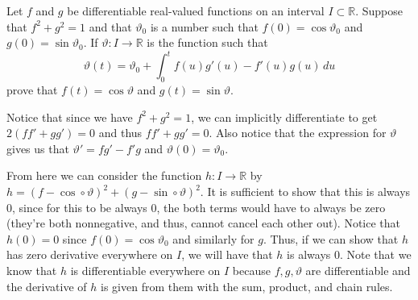 \documentclass[12 pt, letterpaper]{hmcpset}
\begin{document}
\pagebreak

\begin{problem}[Problem 4.]
	Let $f$ and $g$ be differentiable real-valued functions on an interval $I \subset \mathbb{R}$. Suppose that $f^2 + g^2 = 1$ and that $\vartheta_0$ is a number such that $f(0) = \cos \vartheta_0$ and $g(0) = \sin \vartheta_0$. If $\vartheta : I \to \mathbb{R}$ is the function such that
	\[
		\vartheta(t) = \vartheta_0 + \int_0^t f(u) g'(u) - f'(u) g(u) \, du
	\] 
	prove that $f(t) = \cos \vartheta$ and $g(t) = \sin \vartheta$.
\end{problem}

\begin{solution}
	Notice that since we have $f^2 + g^2 = 1$, we can implicitly differentiate to get $2 (f f' + g g') = 0$ and thus $f f' + g g' = 0$. Also notice that the expression for $\vartheta$ gives us that $\vartheta' = f g' - f' g$ and $\vartheta(0) = \vartheta_0$. 

	From here we can consider the function $h : I \to \mathbb{R}$ by $h = (f - \cos \circ \vartheta)^2 + (g - \sin \circ \vartheta)^2$. It is sufficient to show that this is always $0$, since for this to be always $0$, the both terms would have to always be zero (they're both nonnegative, and thus, cannot cancel each other out). Notice that $h(0) = 0$ since $f(0) = \cos \vartheta_0$ and similarly for $g$. Thus, if we can show that $h$ has zero derivative everywhere on $I$, we will have that $h$ is always $0$. Note that we know that $h$ is differentiable everywhere on $I$ because $f, g, \vartheta$ are differentiable and the derivative of $h$ is given from them with the sum, product, and chain rules. 


\end{solution}
\end{document}
